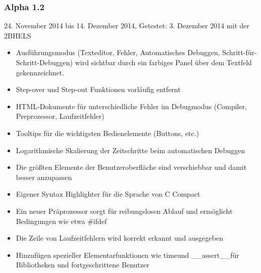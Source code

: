 \subsubsection*{Alpha 1.2}
24. November 2014 bis 14. Dezember 2014,\newline
Getestet: 3. Dezember 2014 mit der 2BHELS
\begin{itemize}
\item Ausführungsmodus (Texteditor, Fehler, Automatisches Debuggen, Schritt-für-Schritt-Debuggen) wird sichtbar durch ein farbiges Panel über dem Textfeld gekennzeichnet.
\item Step-over und Step-out Funktionen vorläufig entfernt
\item HTML-Dokumente für unterschiedliche Fehler im Debugmodus (Compiler, Preprozessor, Laufzeitfehler)
\item Tooltips für die wichtigsten Bedienelemente (Buttons, etc.)
\item Logarithmische Skalierung der Zeitschritte beim automatischen Debuggen
\item Die größten Elemente der Benutzeroberfläche sind verschiebbar und damit besser anzupassen
\item Eigener Syntax Highlighter für die Sprache von C Compact 
\item Ein neuer Präprozessor sorgt für reibungslosen Ablauf und ermöglicht Bedingungen wie etwa \glqq \#ifdef\grqq
\item Die Zeile von Laufzeitfehlern wird korrekt erkannt und ausgegeben
\item Hinzufügen spezieller Elementarfunktionen wie \glqq time\grqq und \glqq \_\_assert\_\_\grqq für Bibliotheken und fortgeschrittene Benutzer
\end{itemize}

